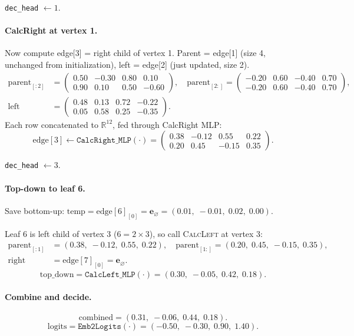 \documentclass[11pt,a4paper]{article}
\newcommand{\R}{\mathbb{R}}
\newcommand{\noinf}{\mathbf{e}_{\varnothing}}
\newcommand{\calL}{\textsc{CalcLeft}}
\begin{document}
\texttt{dec\_head} $\leftarrow 1$.

\paragraph{CalcRight at vertex 1.}
Now compute edge[3] = right child of vertex 1.  Parent = edge[1] (size 4, unchanged from initialization), left = edge[2] (just updated, size 2).
\begin{align*}
\text{parent}_{[:2]} &= \begin{pmatrix} 0.50 & -0.30 & 0.80 & 0.10 \\ 0.90 & 0.10 & 0.50 & -0.60 \end{pmatrix}, \quad
\text{parent}_{[2:]} = \begin{pmatrix} -0.20 & 0.60 & -0.40 & 0.70 \\ -0.20 & 0.60 & -0.40 & 0.70 \end{pmatrix}, \\
\text{left} &= \begin{pmatrix} 0.48 & 0.13 & 0.72 & -0.22 \\ 0.05 & 0.58 & 0.25 & -0.35 \end{pmatrix}.
\end{align*}
Each row concatenated to $\R^{12}$, fed through CalcRight MLP:
\[
\text{edge}[3] \leftarrow \texttt{CalcRight\_MLP}(\cdot) = \begin{pmatrix} 0.38 & -0.12 & 0.55 & 0.22 \\ 0.20 & 0.45 & -0.15 & 0.35 \end{pmatrix}.
\]

\texttt{dec\_head} $\leftarrow 3$.

\paragraph{Top-down to leaf 6.}
Save bottom-up: $\text{temp} = \text{edge}[6]_{[0]} = \noinf = (0.01,\; -0.01,\; 0.02,\; 0.00)$.

Leaf 6 is left child of vertex 3 ($6 = 2 \times 3$), so call \calL{} at vertex 3:
\begin{align*}
\text{parent}_{[:1]} &= (0.38,\; -0.12,\; 0.55,\; 0.22), \quad
\text{parent}_{[1:]} = (0.20,\; 0.45,\; -0.15,\; 0.35), \\
\text{right} &= \text{edge}[7]_{[0]} = \noinf.
\end{align*}
\[
\text{top\_down} = \texttt{CalcLeft\_MLP}(\cdot) = (0.30,\; -0.05,\; 0.42,\; 0.18).
\]

\paragraph{Combine and decide.}
\[
\text{combined} = (0.31,\; -0.06,\; 0.44,\; 0.18).
\]
\[
\text{logits} = \texttt{Emb2Logits}(\cdot) = (-0.50,\; -0.30,\; 0.90,\; 1.40).
\]
\end{document}
